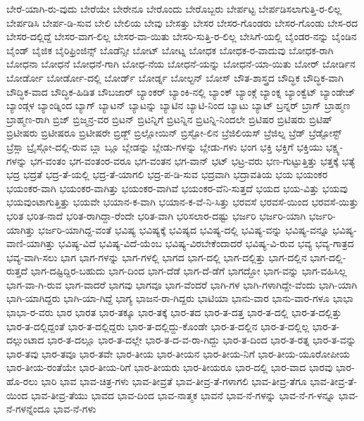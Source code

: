 {ಬೇರೆ-ಯಾಗಿ-ರು-ವುದು
ಬೇರೆಯೇ
ಬೇರೇನೂ
ಬೇರೊಂದು
ಬೇರೊಬ್ಬರು
ಬೇರ್ಪಟ್ಟ
ಬೇರ್ಪಡಿಸಲಾಗುತ್ತಿ-ರ-ಲಿಲ್ಲ
ಬೇರ್ಪಡಿಸಿ
ಬೇರ್ಪ-ಡಿ-ಸುವ
ಬೇಲಿ
ಬೇಲಿಯ
ಬೇವು
ಬೇಸತ್ತು
ಬೇಸರ
ಬೇಸರ-ಗೊಂಡರು
ಬೇಸರ-ಗೊಂಡು
ಬೇಸ-ರದ
ಬೇಸರ-ದಲ್ಲಿದ್ದೆ
ಬೇಸರ-ವಾಗ-ಲಿಲ್ಲ
ಬೇಸರ-ವಾ-ಯಿತು
ಬೇಸರಿ-ಸುತ್ತಿ-ರ-ಲಿಲ್ಲ
ಬೇಸಿಗೆ-ಯಲ್ಲಿ
ಬೈಂಡರ-ನನ್ನು
ಬೈಂಡಿನ
ಬೈಂಡ್
ಬೈಜಿಕ
ಬೈರಿಫ್ರಿಂಜಿನ್ಸ್
ಬೊಡೆನ್ಸೀ
ಬೋಟ್
ಬೋಟ್ನ
ಬೋಧಕ
ಬೋಧಕ-ರ-ವಾದುವು
ಬೋಧಕ-ರಾಗಿ
ಬೋಧನಾ
ಬೋಧನೆ
ಬೋಧನೆ-ಗಾಗಿ
ಬೋಧ-ನೆಯ
ಬೋಧನೆ-ಯನ್ನು
ಬೋಧನೆ-ಯಾ-ಯಿತು
ಬೋರ್
ಬೋರ್ಡಿನ
ಬೋರ್ಡೋ
ಬೋರ್ಡೋ-ದಲ್ಲಿ
ಬೋರ್ಡ್
ಬೋರ್ಡ್ನ
ಬೋಲ್ಟನ್
ಬೋಸ್
ಬೌತ-ಶಾಸ್ತ್ರದ
ಬೌದ್ಧಿಕ
ಬೌದ್ಧಿಕ-ವಾಗಿ
ಬೌದ್ಧಿಕ-ವಾದ
ಬೌದ್ಧಿಕ-ಹಿಡಿತ
ಬೌಬಜಾರ್
ಬ್ಯಾಂಕರ್
ಬ್ಯಾಂಕಿ-ನಲ್ಲಿ
ಬ್ಯಾಂಕ್
ಬ್ಯಾಂಕ್ಗೆ
ಬ್ಯಾಂಕ್ನ
ಬ್ಯಾಂಕ್ವೆಟ್
ಬ್ಯಾಂಡೇಜ್
ಬ್ಯಾಂಡ್ಗಳ
ಬ್ಯಾಂಡ್ನಿಂದ
ಬ್ಯಾಗ್
ಬ್ಯಾಟನ್
ಬ್ಯಾಟನ್ನು
ಬ್ಯಾಟಿನ
ಬ್ಯಾಟಿ-ನಿಂದ
ಬ್ಯಾಟು
ಬ್ಯಾಟ್
ಬ್ರನ್ನರ್
ಬ್ರಾಗ್
ಬ್ರಾಹ್ಮಣ
ಬ್ರಾಹ್ಮಣ-ರಾಗಿ
ಬ್ರಿಜ್
ಬ್ರಿಜ್ಮನ್ರ-ವರ
ಬ್ರಿಟನ್
ಬ್ರಿಟನ್ನಿಗೆ
ಬ್ರಿಟನ್ನಿನ
ಬ್ರಿಟನ್ನಿ-ನಿಂದಲೇ
ಬ್ರಿಟಿಷರ
ಬ್ರಿಟಿಷರು
ಬ್ರಿಟಿಷ್
ಬ್ರಿಟೀಷರು
ಬ್ರಿಟೀಷರೂ
ಬ್ರಿಟೀಷರೇ
ಬ್ರಿಡ್ಜ್
ಬ್ರಿಲ್ಲೋಯಿನ್
ಬ್ರಿಸ್ಟೋ-ಲಿನ
ಬ್ರೆಜಿಲಿಯಸ್
ಬ್ರೆಜಿಲ್ನ
ಬ್ರೆಡ್
ಬ್ರೆಡ್ಟೋಸ್ಟ್
ಬ್ರೆಸ್ಲಾ
ಬ್ರೈಸ್ಗೋ-ದಲ್ಲಿ-ರುವ
ಬ್ಲಾ
ಬ್ಲೂ
ಬ್ಲೇಡನ್ನು
ಬ್ಲೇಡು-ಗಳನ್ನು
ಬ್ಲೇಡು-ಗಳು
ಭಂಗ
ಭಕ್ತಿ
ಭಕ್ತಿಗೆ
ಭಕ್ತಿಯು
ಭಕ್ಷ್ಯ-ಗಳನ್ನು
ಭಗ-ವಂತಂ
ಭಗ-ವಂತಂರ-ವರೂ
ಭಗ-ವಂತನ
ಭಗ-ವಾನ್
ಭಟ್
ಭಟ್ರ-ವರು
ಭಣ-ಗುಟ್ಟುತ್ತಿತ್ತು
ಭತ್ತಕ್ಕೆ
ಭತ್ಯೆ
ಭದ್ರ
ಭದ್ರತೆ
ಭದ್ರ-ತೆ-ಯಲ್ಲಿ
ಭದ್ರ-ತೆ-ಯಾಗಲಿ
ಭದ್ರ-ಪ-ಡಿ-ಸುವ
ಭದ್ರವಾಗಿ
ಭದ್ರಾವತಿಯ
ಭಯ
ಭಯಂಕರ
ಭಯಂಕರ-ವಾಗಿ
ಭಯಂಕರ-ವಾಗಿತ್ತು
ಭಯಂಕರ-ವಾಗಿವೆ
ಭಯಂಕರ-ವೆನಿ-ಸುತ್ತದೆ
ಭಯದ
ಭಯ-ವಿತ್ತು
ಭಯವು
ಭಯವುಂಟಾಗುತ್ತಿತ್ತು
ಭಯವೇ
ಭಯಾನ-ಕ-ವಾಗಿ
ಭಯಾನ-ಕ-ವೆ-ನಿ-ಸಿತ್ತು
ಭರವಸೆ
ಭರವಸೆ-ಯಿಂದ
ಭರವಸೆ-ಯಿತ್ತು
ಭರಿತ
ಭರಿತ-ನಾದೆ
ಭರಿತ-ರಾಗಿದ್ದಾ-ರೆಂದೇ
ಭರಿತ-ವಾಗಿ
ಭರಿಸಲಾರ-ದಷ್ಟು
ಭರ್ಜರಿ
ಭರ್ಜರಿ-ಯಾಗಿ
ಭರ್ಜರಿ-ಯಾಗಿತ್ತು
ಭರ್ಜರಿ-ಯಾಗಿದ್ದ-ವಂತೆ
ಭವಿಷ್ಯ
ಭವಿಷ್ಯಕ್ಕೆ
ಭವಿಷ್ಯದ
ಭವಿಷ್ಯ-ದಲ್ಲಿ
ಭವಿಷ್ಯ-ವನ್ನು
ಭವಿಷ್ಯ-ವನ್ನೂ
ಭವಿಷ್ಯ-ವಾಣಿ-ಯಾಗಿತ್ತು
ಭವಿಷ್ಯ-ವಿದೆ
ಭವಿಷ್ಯ-ವಿದೆ-ಯೆಂಬ
ಭವಿಷ್ಯ-ವಿರಬೇಕೆಂದಾದರೆ
ಭವಿಷ್ಯ-ವಿ-ರುವ
ಭವ್ಯ
ಭವ್ಯ-ಗಾತ್ರದ
ಭವ್ಯ-ವಾಗಿ-ಸಲು
ಭಾಗ
ಭಾಗ-ಗಳನ್ನು
ಭಾಗ-ಗಳಲ್ಲಿ
ಭಾಗದ
ಭಾಗ-ದಲ್ಲಿ
ಭಾಗ-ದಲ್ಲಿತ್ತು
ಭಾಗ-ದಲ್ಲಿನ
ಭಾಗ-ದಲ್ಲಿ-ರುತ್ತದೆ
ಭಾಗ-ದಷ್ಟಿದ್ದಿರ-ಬಹುದು
ಭಾಗ-ದಿಂದ
ಭಾಗ-ದೆಡೆ
ಭಾಗ-ದೆ-ಡೆಗೆ
ಭಾಗದ್ದೋ
ಭಾಗ-ವನ್ನು
ಭಾಗ-ವಹಿಸಿಲ್ಲ
ಭಾಗ-ವಾ-ಗಿ-ರುವ
ಭಾಗ-ವಾದರೆ
ಭಾಗವು
ಭಾಗವೂ
ಭಾಗ-ವೆಂದರೆ
ಭಾಗಿ-ಗಳ
ಭಾಗಿ-ಗಳಾಗಿದ್ದೇ-ವೆಂದು
ಭಾಗಿ-ಯಾಗಿ
ಭಾಗಿ-ಯಾಗಿದ್ದರು
ಭಾಗಿ-ಯಾ-ಗಿದ್ದೆ
ಭಾಗ್ಯ
ಭಾಜನ-ರಾ-ಗಿದ್ದರು
ಭಾಟಿಯಾ
ಭಾನು-ವಾರ
ಭಾನು-ವಾರ-ಗಳೂ
ಭಾಭಾ
ಭಾಭಾ-ರ-ವರು
ಭಾರ
ಭಾರತ
ಭಾರ-ತಕ್ಕೂ
ಭಾರ-ತಕ್ಕೆ
ಭಾರ-ತದ
ಭಾರ-ತ-ದತ್ತ
ಭಾರ-ತ-ದಲ್ಲಿ
ಭಾರ-ತ-ದಲ್ಲಿತ್ತು
ಭಾರ-ತ-ದಲ್ಲಿದ್ದಂತೆ
ಭಾರ-ತ-ದಲ್ಲಿದ್ದರು
ಭಾರ-ತ-ದಲ್ಲಿದ್ದು-ಕೊಂಡೇ
ಭಾರ-ತ-ದಲ್ಲಿನ
ಭಾರ-ತ-ದಲ್ಲಿಲ್ಲ
ಭಾರ-ತ-ದಲ್ಲುಂಟಾದ
ಭಾರ-ತ-ದಲ್ಲೂ
ಭಾರ-ತ-ದಲ್ಲೇ
ಭಾರ-ತ-ದ-ವ-ರಾ-ಗಿದ್ದು
ಭಾರ-ತ-ದಿಂದ
ಭಾರ-ತ-ರತ್ನ
ಭಾರ-ತ-ವನ್ನು
ಭಾರ-ತವು
ಭಾರ-ತವೂ
ಭಾರ-ತವೇ
ಭಾರ-ತೀಯ
ಭಾರ-ತೀಯನ
ಭಾರ-ತೀಯ-ನಿಗೆ
ಭಾರ-ತೀಯ-ಯೂರೋಪೀಯ
ಭಾರ-ತೀಯ-ರಂತೆಯೇ
ಭಾರ-ತೀಯ-ರಿಗೆ
ಭಾರ-ತೀಯರು
ಭಾರ-ತೀಯರೂ
ಭಾರ-ದಲ್ಲಿ
ಭಾರ-ವಾದ
ಭಾರವು
ಭಾರ-ಹೊ-ರಲು
ಭಾರಿ
ಭಾವ
ಭಾವ-ಚಿತ್ರ-ಗಳು
ಭಾವ-ತೀವ್ರತೆ
ಭಾವ-ತೀವ್ರ-ತೆ-ಗಳಾಗಲಿ
ಭಾವ-ತೀವ್ರ-ತೆಗೂ
ಭಾವ-ತೀವ್ರ-ತೆ-ಯಿಂದ
ಭಾವ-ತೀವ್ರ-ತೆಯು
ಭಾವದ
ಭಾವ-ದಿಂದ
ಭಾವ-ನಾತ್ಮಕ
ಭಾವನೆ
ಭಾವ-ನೆ-ಗಳನ್ನು
ಭಾವ-ನೆ-ಗ-ಳನ್ನೂ
ಭಾವ-ನೆ-ಗಳನ್ನೆಂದೂ
ಭಾವ-ನೆ-ಗಳು
}
